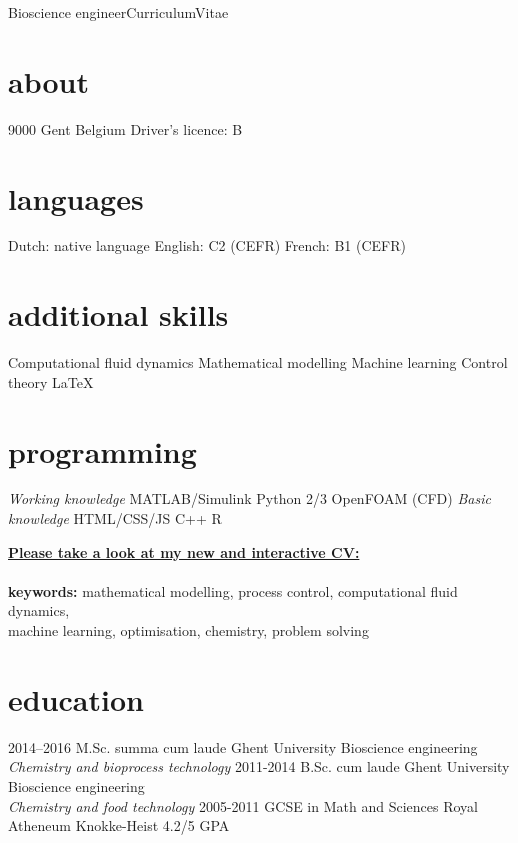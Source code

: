 \documentclass[]{friggeri-cv}
\begin{document}
       {Bioscience engineer}{Curriculum}{Vitae}
 \begin{aside}
  \vspace{0.6cm}\section{about}
    9000 Gent
    Belgium \vspace{0.21cm}
     \vspace{0.21cm}
    Driver's licence: B \vspace{-1.25mm}
  \section{languages}
    Dutch: native language
    English: C2 (CEFR)
    French:  B1  (CEFR) \vspace{3.3mm}
  \section{additional skills}
  Computational fluid dynamics
  Mathematical modelling
  Machine learning
  Control theory 
  LaTeX \vspace{3.3mm}
  \section{programming} 
  \textit{Working knowledge}
  MATLAB/Simulink
  Python 2/3
  OpenFOAM (CFD) \vspace{0.15cm}
  \textit{Basic knowledge}
  HTML/CSS/JS
  C++
  R
\end{aside}
{\hspace{-6cm} \href{http://bramdejaegher.be/CV.html}{\textbf{Please take a look at my new and interactive CV:} }\\ \\}
{\textbf{keywords:} mathematical modelling, process control, computational fluid dynamics,\\ machine learning, optimisation, chemistry, problem solving}
\vspace{3mm}
\section{education}
\begin{entrylist}
    \entry
    {2014–2016}
    {M.Sc. summa cum laude}
    {Ghent University}
    {Bioscience engineering\\
    \emph{Chemistry and bioprocess technology}}
  \entry
    {2011-2014}
    {B.Sc. cum laude}
    {Ghent University}
    {Bioscience engineering\\
    \emph{Chemistry and food technology}}
  \entry
    {2005-2011}
    {GCSE in Math and Sciences}
    {Royal Atheneum Knokke-Heist}
    {4.2/5 GPA}
\end{entrylist}
\end{document}
